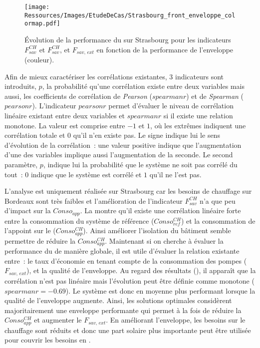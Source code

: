 \begin{figure}
    \centering
    \texttt{[image: Ressources/Images/EtudeDeCas/Strasbourg\_front\_enveloppe\_colormap.pdf]}
    \caption[Évolution de la performance du  en fonction de la qualité de l’enveloppe]
             {Évolution de la performance du  sur Strasbourg pour les indicateurs $F_{sav}^{CH}$
              et $F_{sav}^{CH}$, et $F_{sav,\,ext}$ en fonction de la performance de l’enveloppe (couleur).}
    \label{fig:pareto_enveloppe_strasbourg}
\end{figure}


Afin de mieux caractériser les corrélations existantes, $3$ indicateurs sont introduits,
$p$, la probabilité qu’une corrélation existe entre deux variables mais aussi, les
coefficients de corrélation de \textit{Pearson} ($spearmanr$) et de \textit{Spearman}
($pearsonr$). L’indicateur $pearsonr$ permet d’évaluer le niveau de corrélation linéaire
existant entre deux variables et $spearmanr$ si il existe une relation monotone. La valeur
est comprise entre $-1$ et $1$, où les extrêmes indiquent une corrélation totale et $0$
qu’il n’en existe pas. Le signe indique lui le sens d’évolution de la corrélation~: une
valeur positive indique que l’augmentation d’une des variables implique aussi
l’augmentation de la seconde. Le second paramètre, $p$, indique lui la probabilité que le
système ne soit pas corrélé du tout~: $0$ indique que le système est corrélé et $1$ qu’il
ne l’est pas.

L’analyse est uniquement réalisée sur Strasbourg car les besoins de chauffage sur Bordeaux
sont très faibles et l’amélioration de l’indicateur $F_{sav}^{CH}$ n’a que peu d’impact sur
la $Conso_{app}$. La  montre qu’il existe une corrélation linéaire forte entre la
consommation du système de référence ($Conso_{ref}^{CH}$) et la consommation de l’appoint sur
le  ($Conso_{app}^{CH}$). Ainsi améliorer l’isolation du bâtiment semble permettre
de réduire la $Conso_{app}^{CH}$. Maintenant si on cherche à évaluer la performance du
 de manière globale, il est utile d’évaluer la relation existante entre~:
le taux d’économie en tenant compte de la consommation des pompes ($F_{sav,\,ext}$), et
la qualité de l’enveloppe. Au regard des résultats (),
il apparaît que la corrélation n’est pas linéaire mais l’évolution peut être définie
comme monotone ($spearmanr = \num{-0.69}$). Le système est donc en moyenne plus performant
lorsque la qualité de l’enveloppe augmente. Ainsi, les solutions optimales
considèrent majoritairement une enveloppe performante qui permet à la fois de réduire
la $Conso_{app}^{CH}$ et augmenter le $F_{sav,\,ext}$. En améliorant l’enveloppe, les besoins
sur le chauffage sont réduits et donc une part solaire plus importante peut être
utilisée pour couvrir les besoins en .

